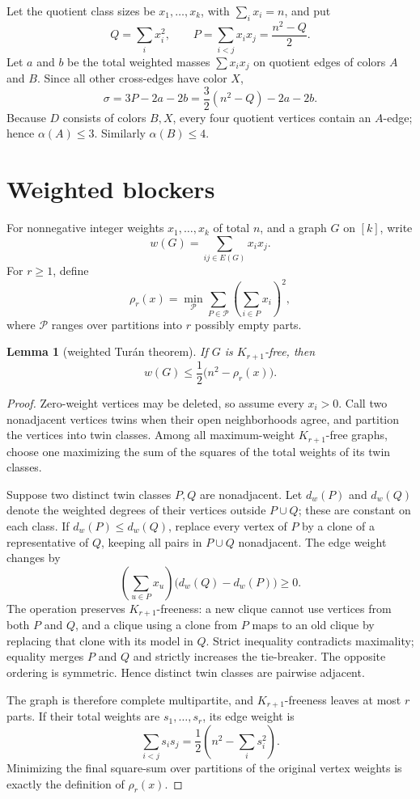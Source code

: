 \documentclass[11pt]{article}
\theoremstyle{plain}
\newtheorem{lemma}[theorem]{Lemma}
\theoremstyle{definition}
\theoremstyle{remark}
\newcommand{\1}{\mathbf 1}
\begin{document}
Let the quotient class sizes be $x_1,\ldots,x_k$, with $\sum_i x_i=n$, and
put
\[
 Q=\sum_i x_i^2,
 \qquad P=\sum_{i<j}x_i x_j=\frac{n^2-Q}{2}.
\]
Let $a$ and $b$ be the total weighted masses $\sum x_i x_j$ on quotient
edges of colors $A$ and $B$.  Since all other cross-edges have color $X$,
\begin{equation}\label{eq:sigmaquot}
 \sigma=3P-2a-2b=\frac32(n^2-Q)-2a-2b.
\end{equation}
Because $D$ consists of colors $B,X$, every four quotient vertices contain an
$A$-edge; hence $\alpha(A)\leq3$.  Similarly $\alpha(B)\leq4$.

\section{Weighted blockers}\label{sec:blocker}

For nonnegative integer weights $x_1,\ldots,x_k$ of total $n$, and a graph
$G$ on $[k]$, write
\[
 w(G)=\sum_{ij\in E(G)}x_i x_j.
\]
For $r\geq1$, define
\[
 \rho_r(x)=\min_{\mathcal P}\sum_{P\in\mathcal P}
 \left(\sum_{i\in P}x_i\right)^2,
\]
where $\mathcal P$ ranges over partitions into $r$ possibly empty parts.

\begin{lemma}[weighted Tur\'an theorem]\label{lem:weighted-turan}
If $G$ is $K_{r+1}$-free, then
\[
 w(G)\leq\frac12\bigl(n^2-\rho_r(x)\bigr).
\]
\end{lemma}

\begin{proof}
Zero-weight vertices may be deleted, so assume every $x_i>0$.  Call two
nonadjacent vertices twins when their open neighborhoods agree, and partition
the vertices into twin classes.  Among all maximum-weight
$K_{r+1}$-free graphs, choose one maximizing the sum of the squares of the
total weights of its twin classes.

Suppose two distinct twin classes $P,Q$ are nonadjacent.  Let $d_w(P)$ and
$d_w(Q)$ denote the weighted degrees of their vertices outside
$P\cup Q$; these are constant on each class.  If
$d_w(P)\leq d_w(Q)$, replace every vertex of $P$ by a clone of a
representative of $Q$, keeping all pairs in $P\cup Q$ nonadjacent.  The edge
weight changes by
\[
 \left(\sum_{u\in P}x_u\right)\bigl(d_w(Q)-d_w(P)\bigr)\geq0.
\]
The operation preserves $K_{r+1}$-freeness: a new clique cannot use vertices
from both $P$ and $Q$, and a clique using a clone from $P$ maps to an old
clique by replacing that clone with its model in $Q$.  Strict inequality
contradicts maximality; equality merges $P$ and $Q$ and strictly increases the
tie-breaker.  The opposite ordering is symmetric.  Hence distinct twin
classes are pairwise adjacent.

The graph is therefore complete multipartite, and $K_{r+1}$-freeness leaves
at most $r$ parts.  If their total weights are $s_1,\ldots,s_r$, its edge
weight is
\[
 \sum_{i<j}s_i s_j=\frac12\left(n^2-\sum_i s_i^2\right).
\]
Minimizing the final square-sum over partitions of the original vertex
weights is exactly the definition of $\rho_r(x)$.
\end{proof}
\end{document}
